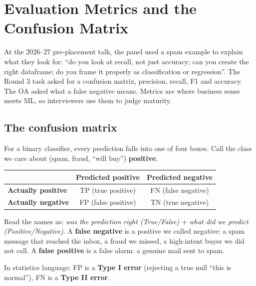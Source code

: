 \chapter{Evaluation Metrics and the Confusion Matrix}

At the 2026--27 pre-placement talk, the panel used a spam example to explain what they look for: ``do you look at
recall, not just accuracy; can you create the right dataframe; do you frame it properly as classification or
regression''. The Round 3 task asked for a confusion matrix, precision, recall, F1 and accuracy. The OA asked what a false
negative means. Metrics are where business sense meets ML, so interviewers use them to judge maturity.

\section{The confusion matrix}
For a binary classifier, every prediction falls into one of four boxes. Call the class we care about (spam, fraud,
``will buy'') \textbf{positive}.
\begin{center}
\begin{tabular}{l|cc}
& \textbf{Predicted positive} & \textbf{Predicted negative}\\\hline
\textbf{Actually positive} & TP (true positive) & FN (false negative)\\
\textbf{Actually negative} & FP (false positive) & TN (true negative)\\
\end{tabular}
\end{center}
Read the names as: \emph{was the prediction right (True/False)} + \emph{what did we predict (Positive/Negative)}.
A \textbf{false negative} is a positive we called negative: a spam message that reached the inbox, a fraud we missed, a
high-intent buyer we did not call. A \textbf{false positive} is a false alarm: a genuine mail sent to spam.

In statistics language: FP is a \textbf{Type I error} (rejecting a true null ``this is normal''), FN is a \textbf{Type II
error}.


